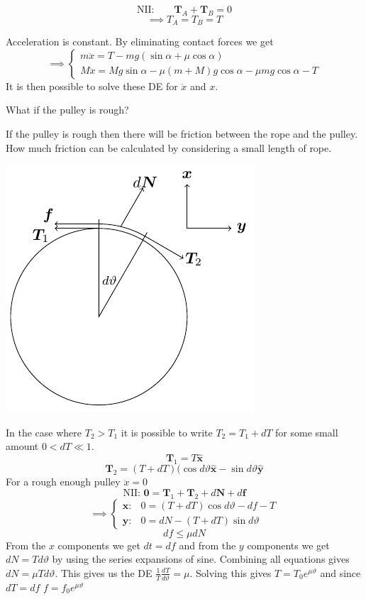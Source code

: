 \documentclass{article}
\newcommand{\vh}[1]{\vec{\hat{#1}}}
\renewcommand{\vec}[1]{\bm{#1}}
\newcommand{\vv}[1]{\vec{#1}}
\newcommand{\dv}[3][]{\frac{d^{#1}{#2}}{d{#3}^{#1}}}
\begin{document}
\[\text{NII:}\qquad \vv T_A+\vv T_B=0\]
\[\implies T_A=T_B=T\]

Acceleration is constant. By eliminating contact forces we get
\[\implies\left\{
\begin{array}{c}
m\ddot x=T-mg(\sin\alpha+\mu\cos\alpha)\\
M\ddot x=Mg\sin\alpha-\mu(m+M)g\cos\alpha-\mu mg\cos\alpha-T
\end{array}
\right.\]
It is then possible to solve these DE for \(\ddot x\) and \(x\).

What if the pulley is rough?

If the pulley is rough then there will be friction between the rope and the pulley. How much friction can be calculated by considering a small length of rope.

\begin{center}
\includegraphics[scale=0.6]{RoughPulley}
\end{center}

In the case where \(T_2>T_1\) it is possible to write \(T_2=T_1+dT\) for some small amount \(0<dT\ll1\).
\[\vv T_1=T\vh x\]
\[\vv T_2=(T+dT)(\cos d\vartheta\vh x-\sin d\vartheta\vh y\]
For a rough enough pulley \(\ddot x=0\)
\[\text{NII: } \vv 0=\vv T_1+\vv T_2+d\vv N+d\vv f\]
\[\implies\left\{
\begin{array}{cc}
\vv x: & 0=(T+dT)\cos d\vartheta-df-T\\
\vv y: & 0=dN-(T+dT)\sin d\vartheta
\end{array}
\right.\]
\[df\le\mu dN\]
From the \(x\) components we get \(dt=df\) and from the \(y\) components we get \(dN=Td\vartheta\) by using the series expansions of sine. Combining all equations gives \(dN=\mu Td\vartheta\). This gives us the DE \(\frac 1T\dv T\vartheta=\mu\). Solving this gives \(T=T_0e^{\mu\vartheta}\) and since \(dT=df\) \(f=f_0e^{\mu\vartheta}\)
\end{document}
